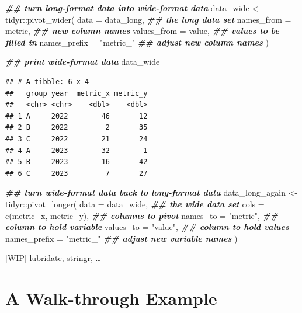 \documentclass[
]{krantz}
\makeatletter
\newenvironment{Shaded}{\begin{snugshade}}{\end{snugshade}}
\newcommand{\AttributeTok}[1]{\textcolor[rgb]{0.61,0.61,0.61}{#1}}
\newcommand{\DocumentationTok}[1]{\textcolor[rgb]{0.37,0.37,0.37}{\textbf{\textit{#1}}}}
\newcommand{\FunctionTok}[1]{\textcolor[rgb]{0,0,0}{#1}}
\newcommand{\NormalTok}[1]{#1}
\newcommand{\OtherTok}[1]{\textcolor[rgb]{0.37,0.37,0.37}{#1}}
\newcommand{\SpecialCharTok}[1]{\textcolor[rgb]{0,0,0}{#1}}
\newcommand{\StringTok}[1]{\textcolor[rgb]{0.5,0.5,0.5}{#1}}
\newenvironment{kframe}{%
\medskip{}
\setlength{\fboxsep}{.8em}
 \def\at@end@of@kframe{}%
 \ifinner\ifhmode%
  \def\at@end@of@kframe{\end{minipage}}%
  \begin{minipage}{\columnwidth}%
 \fi\fi%
 \def\FrameCommand##1{\hskip\@totalleftmargin \hskip-\fboxsep
 \colorbox{shadecolor}{##1}\hskip-\fboxsep
     \hskip-\linewidth \hskip-\@totalleftmargin \hskip\columnwidth}%
 \MakeFramed {\advance\hsize-\width
   \@totalleftmargin\z@ \linewidth\hsize
   \@setminipage}}%
 {\par\unskip\endMakeFramed%
 \at@end@of@kframe}
\renewenvironment{Shaded}{\begin{kframe}}{\end{kframe}}
\makeatother
\begin{document}
\begin{Shaded}
\begin{Highlighting}[]
\DocumentationTok{\#\# turn long{-}format data into wide{-}format data}
\NormalTok{data\_wide }\OtherTok{\textless{}{-}}\NormalTok{ tidyr}\SpecialCharTok{::}\FunctionTok{pivot\_wider}\NormalTok{(}
  \AttributeTok{data =}\NormalTok{ data\_long,        }\DocumentationTok{\#\# the long data set}
  \AttributeTok{names\_from =}\NormalTok{ metric,     }\DocumentationTok{\#\# new column names}
  \AttributeTok{values\_from =}\NormalTok{ value,     }\DocumentationTok{\#\# values to be filled in}
  \AttributeTok{names\_prefix =} \StringTok{"metric\_"} \DocumentationTok{\#\# adjust new column names}
\NormalTok{)}

\DocumentationTok{\#\# print wide{-}format data}
\NormalTok{data\_wide}
\end{Highlighting}
\end{Shaded}

\begin{verbatim}
## # A tibble: 6 x 4
##   group year  metric_x metric_y
##   <chr> <chr>    <dbl>    <dbl>
## 1 A     2022        46       12
## 2 B     2022         2       35
## 3 C     2022        21       24
## 4 A     2023        32        1
## 5 B     2023        16       42
## 6 C     2023         7       27
\end{verbatim}

\begin{Shaded}
\begin{Highlighting}[]
\DocumentationTok{\#\# turn wide{-}format data back to long{-}format data}
\NormalTok{data\_long\_again }\OtherTok{\textless{}{-}}\NormalTok{ tidyr}\SpecialCharTok{::}\FunctionTok{pivot\_longer}\NormalTok{(}
  \AttributeTok{data =}\NormalTok{ data\_wide,             }\DocumentationTok{\#\# the wide data set}
  \AttributeTok{cols =} \FunctionTok{c}\NormalTok{(metric\_x, metric\_y), }\DocumentationTok{\#\# columns to pivot}
  \AttributeTok{names\_to =} \StringTok{"metric"}\NormalTok{,          }\DocumentationTok{\#\# column to hold variable}
  \AttributeTok{values\_to =} \StringTok{"value"}\NormalTok{,          }\DocumentationTok{\#\# column to hold values}
  \AttributeTok{names\_prefix =} \StringTok{"metric\_"}      \DocumentationTok{\#\# adjust new variable names}
\NormalTok{)}
\end{Highlighting}
\end{Shaded}

{[}WIP{]} lubridate, stringr, \ldots{}

\hypertarget{walkthrough}{%
\chapter{A Walk-through Example}\label{walkthrough}}
\end{document}
